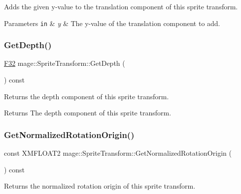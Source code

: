 Adds the given y-\/value to the translation component of this sprite transform.


\begin{DoxyParams}[1]{Parameters}
\mbox{\tt in}  & {\em y} & The y-\/value of the translation component to add. \\
\hline
\end{DoxyParams}
\hypertarget{structmage_1_1_sprite_transform_acbb61149d34be717c43a78fc9113fe9c}{}\label{structmage_1_1_sprite_transform_acbb61149d34be717c43a78fc9113fe9c} 
\subsubsection{\texorpdfstring{Get\+Depth()}{GetDepth()}}
{\footnotesize\ttfamily \hyperlink{namespacemage_aa97e833b45f06d60a0a9c4fc22ae02c0}{F32} mage\+::\+Sprite\+Transform\+::\+Get\+Depth (\begin{DoxyParamCaption}{ }\end{DoxyParamCaption}) const\hspace{0.3cm}{\ttfamily [noexcept]}}

Returns the depth component of this sprite transform.

\begin{DoxyReturn}{Returns}
The depth component of this sprite transform. 
\end{DoxyReturn}
\hypertarget{structmage_1_1_sprite_transform_aae811b88ac3cbd5ac18c67ddd81bef99}{}\label{structmage_1_1_sprite_transform_aae811b88ac3cbd5ac18c67ddd81bef99} 
\subsubsection{\texorpdfstring{Get\+Normalized\+Rotation\+Origin()}{GetNormalizedRotationOrigin()}}
{\footnotesize\ttfamily const X\+M\+F\+L\+O\+A\+T2 mage\+::\+Sprite\+Transform\+::\+Get\+Normalized\+Rotation\+Origin (\begin{DoxyParamCaption}{ }\end{DoxyParamCaption}) const}

Returns the normalized rotation origin of this sprite transform.

